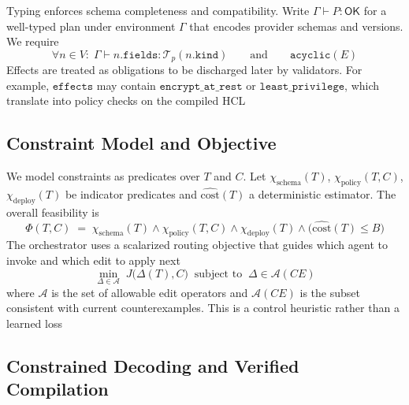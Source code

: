 \documentclass[manuscript,screen,nonacm]{acmart}
\begin{document}
Typing enforces schema completeness and compatibility. Write $\Gamma \vdash P : \mathsf{OK}$ for a well-typed plan under environment $\Gamma$ that encodes provider schemas and versions. We require
\begin{equation}
\forall n \in V:\; \Gamma \vdash n.\texttt{fields} : \mathcal{T}_p(n.\texttt{kind}) \qquad \text{and} \qquad \mathtt{acyclic}(E)
\end{equation}
Effects are treated as obligations to be discharged later by validators. For example, $\texttt{effects}$ may contain $\mathtt{encrypt\_at\_rest}$ or $\mathtt{least\_privilege}$, which translate into policy checks on the compiled HCL

\subsection{Constraint Model and Objective}
\label{sec:constraints}

We model constraints as predicates over $T$ and $C$. Let $\chi_{\text{schema}}(T)$, $\chi_{\text{policy}}(T,C)$, $\chi_{\text{deploy}}(T)$ be indicator predicates and $\widehat{\mathrm{cost}}(T)$ a deterministic estimator. The overall feasibility is
\begin{equation}
\Phi(T,C) \;=\; \chi_{\text{schema}}(T) \wedge \chi_{\text{policy}}(T,C) \wedge \chi_{\text{deploy}}(T) \wedge \big( \widehat{\mathrm{cost}}(T) \le B \big)
\end{equation}
The orchestrator uses a scalarized routing objective that guides which agent to invoke and which edit to apply next
\begin{equation}
\label{eq:objective}
\min_{\Delta \in \mathcal{A}} \; J\big( \Delta(T), C \big) \;\;\text{subject to}\;\; \Delta \in \mathcal{A}(CE)
\end{equation}
where $\mathcal{A}$ is the set of allowable edit operators and $\mathcal{A}(CE)$ is the subset consistent with current counterexamples. This is a control heuristic rather than a learned loss

\subsection{Constrained Decoding and Verified Compilation}
\label{sec:decoding}
\end{document}
